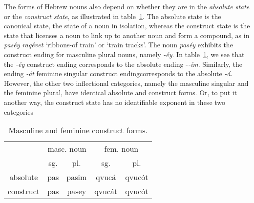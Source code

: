 The forms of Hebrew nouns also depend on whether they are in the \emph{absolute state} or the \emph{construct state}, as illustrated in table~\ref{tab:cstr-endings}. The absolute state is the canonical state, the state of a noun in isolation, whereas the construct state is the state that licenses a noun to link up to another noun and form a compound, as in \textit{pas\'{e}y raq\'{e}vet} `ribbons-of train' or `train tracks'. The noun \textit{pas\'{e}y} exhibits the construct ending for masculine plural nouns, namely \textit{-\'{e}y}. 
In table~\ref{tab:cstr-endings}, we see that the \textit{-\'{e}y} construct ending corresponds to the absolute ending -\textit{-\'{i}m}. Similarly, the ending \textit{-\'{a}t} feminine singular construct endingcorresponds to the absolute \textit{-\'{a}}. 
However, the other two inflectional categories, namely the masculine singular and the feminine plural, have identical absolute and construct forms. Or, to put it another way, the construct state has no identifiable exponent in these two categories


    
 
   \begin{table}[h!]
      \small
      \centering
      \setlength{\extrarowheight}{8pt}
      \begin{tabular}{ccccc} 
 \toprule
 &  \multicolumn{2}{c}{masc. noun} & \multicolumn{2}{c}{fem. noun} \\
 &  sg. & pl. & sg. & pl. \\
 \cmidrule(lr){2-3} \cmidrule(lr){4-5}
    absolute & pas & pasim  & qvuc\'{a}	& qvuc\'{o}t \\
    construct & pas & pasey	& qvuc\'{a}t	& qvuc\'{o}t\\
    \bottomrule
    \end{tabular}
    \label{tab:cstr-endings}
    \caption{Masculine and feminine construct forms.}
    \end{table}
    
